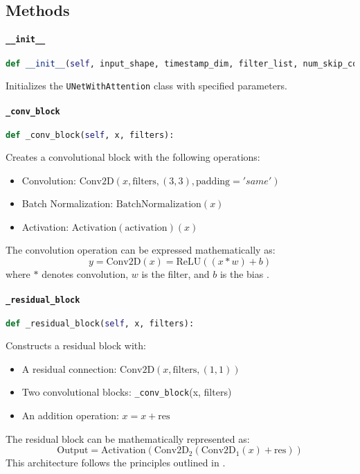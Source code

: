 \documentclass{article}
\begin{document}
\subsection{Methods}

\paragraph{\texttt{\_\_init\_\_}}
\begin{lstlisting}[language=Python]
def __init__(self, input_shape, timestamp_dim, filter_list, num_skip_connections, num_heads=4, key_dim=64, use_bias=False, activation='swish'):
\end{lstlisting}
Initializes the \texttt{UNetWithAttention} class with specified parameters.

\paragraph{\texttt{\_conv\_block}}
\begin{lstlisting}[language=Python]
def _conv_block(self, x, filters):
\end{lstlisting}
Creates a convolutional block with the following operations:
\begin{itemize}
    \item Convolution: \( \text{Conv2D}(x, \text{filters}, (3, 3), \text{padding}='same') \)
    \item Batch Normalization: \( \text{BatchNormalization}(x) \)
    \item Activation: \( \text{Activation}(\text{activation})(x) \)
\end{itemize}
The convolution operation can be expressed mathematically as:
\[
y = \text{Conv2D}(x) = \text{ReLU}((x * w) + b)
\]
where \( * \) denotes convolution, \( w \) is the filter, and \( b \) is the bias \cite{lecun1998gradient}.

\paragraph{\texttt{\_residual\_block}}
\begin{lstlisting}[language=Python]
def _residual_block(self, x, filters):
\end{lstlisting}
Constructs a residual block with:
\begin{itemize}
    \item A residual connection: \( \text{Conv2D}(x, \text{filters}, (1, 1)) \)
    \item Two convolutional blocks: \texttt{\_conv\_block}(x, filters)
    \item An addition operation: \( x = x + \text{res} \)
\end{itemize}
The residual block can be mathematically represented as:
\[
\text{Output} = \text{Activation}(\text{Conv2D}_2(\text{Conv2D}_1(x) + \text{res}))
\]
This architecture follows the principles outlined in \cite{he2016deep}.
\end{document}
